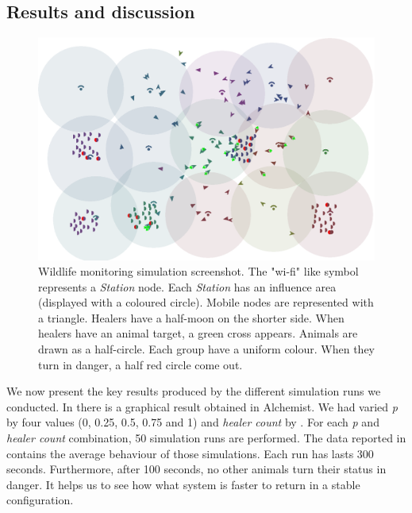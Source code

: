 \subsection{Results and discussion}\label{sb:results}

\begin{figure}[t!]
\centering
\includegraphics[width=\textwidth]{papers/mdpi2020/imgs/alchemist-v2.png}

\caption{Wildlife monitoring simulation screenshot. 
 The "wi-fi" like symbol represents a \emph{Station} node. 
 Each \emph{Station} has an influence area (displayed with a coloured circle). 
 Mobile nodes are represented with a triangle.
 Healers have a half-moon on the shorter side. 
 When healers have an animal target, a green cross appears. 
 Animals are drawn as a half-circle. Each group have a uniform colour. 
 When they turn in danger, a half red circle come out.
}
\label{fig:wildlife-monitoring-gui}
\end{figure}

We now present the key results produced 
 by the different simulation runs we conducted. In  there is
 a graphical result obtained in Alchemist.
%
 We had varied \emph{p} by four values (0, 0.25, 0.5, 0.75 and 1) and \emph{healer count} by . 
 For each \emph{p} and \emph{healer count} combination, 50 simulation runs are performed. 
 The data reported in  contains the average behaviour of those simulations. 
% 
%
Each run has lasts 300 seconds. 
 Furthermore, after 100 seconds, no other animals turn their status in danger.
 It helps us to see how what system is faster to return in a stable configuration.

